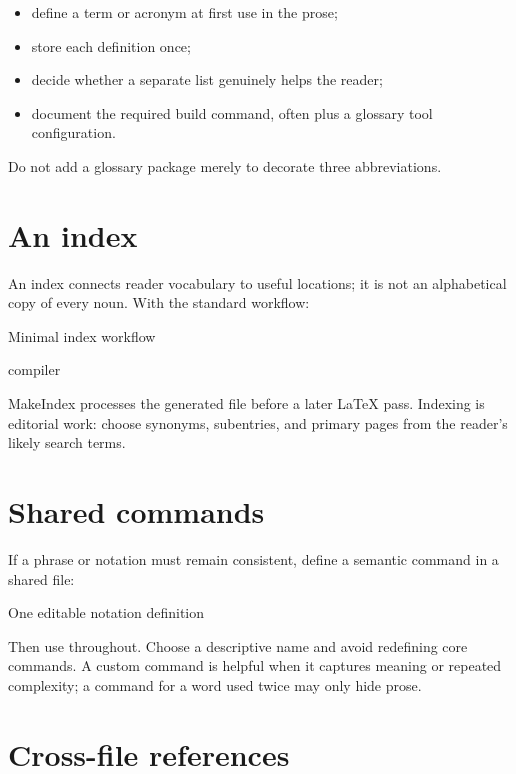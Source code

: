 \begin{itemize}
  \item define a term or acronym at first use in the prose;
  \item store each definition once;
  \item decide whether a separate list genuinely helps the reader;
  \item document the required build command, often  plus a
        glossary tool configuration.
\end{itemize}

Do not add a glossary package merely to decorate three abbreviations.

\section{An index}

An index connects reader vocabulary to useful locations; it is not an
alphabetical copy of every noun. With the standard  workflow:

\begin{latexcode}{Minimal index workflow}
\usepackage{makeidx}
\makeindex

compiler

\printindex
\end{latexcode}

MakeIndex processes the generated  file before a later \LaTeX{} pass.
Indexing is editorial work: choose synonyms, subentries, and primary pages from
the reader's likely search terms.

\section{Shared commands}

If a phrase or notation must remain consistent, define a semantic command in a
shared file:

\begin{latexcode}{One editable notation definition}
\newcommand{\MeanDifference}{\ensuremath{\bar d}}
\end{latexcode}

Then use  throughout. Choose a descriptive name and avoid
redefining core commands. A custom command is helpful when it captures meaning
or repeated complexity; a command for a word used twice may only hide prose.

\section{Cross-file references}


